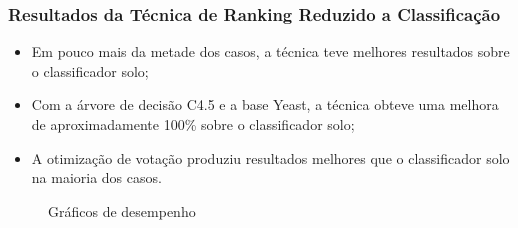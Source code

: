 \begin{frame}
    \frametitle{Resultados da Técnica de Ranking Reduzido a Classificação}

    \begin{itemize}
        \item Em pouco mais da metade dos casos, a técnica teve melhores resultados sobre o classificador solo;
        \item Com a árvore de decisão C4.5 e a base Yeast, a técnica obteve uma melhora de aproximadamente 100\% sobre o classificador solo;
        \item A otimização de votação produziu resultados melhores que o classificador solo na maioria dos casos.
    \end{itemize}

    \begin{figure}[H]
        \centering
        \caption{Gráficos de desempenho}
    \end{figure}
\end{frame}